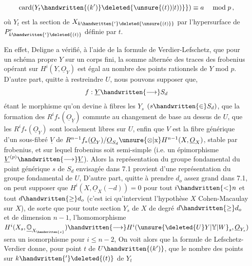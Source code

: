 
\[
\operatorname{card}(Y_t\handwritten{(k')}\deleted{\unsure{(t))|t))}}) \equiv a \quad \bmod p\,,
\]
où $Y_t$ est la section de $X_{k\handwritten{'}\deleted{\unsure{(t)}}}$ par l'hypersurface de $P^r_{k\handwritten{'}\deleted{(t)}}$ définie par $t$.

En effet, Deligne a vérifié, à l'aide de la formule de Verdier-Lefschetz, que pour un schéma propre $Y$ sur un corps fini, la somme alternée des traces  des frobenius opérant sur $H^i(Y,\underline{O}_Y)$ est  égal au nombre des points rationnels de $Y$ mod $p$. D'autre part, quitte à restreindre $U$, nous pouvons supposer que,
\[
f:\underline{Y}\handwritten{\longrightarrow} S_d
\]
étant le morphisme qu'on devine à fibres les $Y_s$ $(s\handwritten{\in}S_d)$, que  la formation des $R^if_*(\underline{O}_{\underline{Y}})$ commute au changement de base au dessus de $U$,  que les $R^if_*(\underline{O}_Y)$ sont localement libres sur $U$, enfin que $V$ est la fibre  générique d'un sous-fibré $\underline{V}$ de $R^{n-1}f_*(\underline{O}_Y)/\underline{O}_{S_d}\unsure{\otimes|\mathbin{\mathrm{x}}}H^{n-1}(X,\underline{O}_X)$, stable par frobenius, et sur lequel frobenius soit semi-simple (i.e. un épimorphisme $\underline{V}^{(p)}\handwritten{\longrightarrow}\underline{V}$). Alors la représentation du groupe fondamental du point générique $s$ de $S_d$ envisagée dans 7.1 provient d'une représentation du groupe fondamental  \handwritten{$\pi$} de $U$,  D'autre part, quitte à prendre $d_o$ assez grand dans 7.1, on peut supposer que  $H^i(X,\underline{O}_X(-d))=0$ pour tout $i\handwritten{<}n$ et tout $d\handwritten{\geq}d_o$ (c'est ici qu'intervient l'hypothèse $X$ Cohen-Macaulay sur $X$), de sorte que pour toute section $Y_s$ de $X$ de degré $d\handwritten{\geq}d_o$ et de dimension $n-1$, l'homomorphisme $H^i(X_s,\underline{\mathbb{O}}_{X_{\handwritten{s}}})\handwritten{\longrightarrow}H^i(\unsure{\deleted{U}Y|\mathbb{Y}|W}_s,\underline{O}_{Y_s})$ sera un isomorphisme pour $i\leq n-2$,  On voit alors que la formule de Lefschetz-Verdier donne, pour  point  $t$ de $U\handwritten{(k')}$, que le nombre des points  sur $k\handwritten{'}\deleted{(t)}$ de $Y_t$ 
